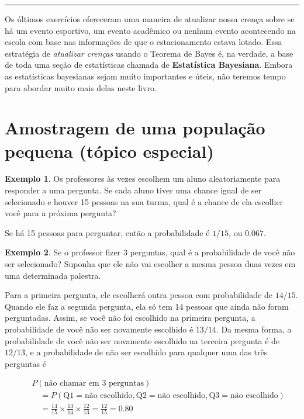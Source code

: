 \documentclass[
]{book}
\theoremstyle{definition}
\theoremstyle{definition}
\newtheorem{example}{Exemplo}[chapter]
\theoremstyle{definition}
\theoremstyle{definition}
\theoremstyle{remark}
\begin{document}
\begin{center}\rule{0.5\linewidth}{0.5pt}\end{center}

Os últimos exercícios ofereceram uma maneira de atualizar nossa crença sobre se há um evento esportivo, um evento acadêmico ou nenhum evento acontecendo na escola com base nas informações de que o estacionamento estava lotado. Essa estratégia de \emph{atualizar crenças} usando o Teorema de Bayes é, na verdade, a base de toda uma seção de estatísticas chamada de \textbf{Estatística Bayesiana}. Embora as estatísticas bayesianas sejam muito importantes e úteis, não teremos tempo para abordar muito mais delas neste livro.

\hypertarget{smallPop}{%
\section{Amostragem de uma população pequena (tópico especial)}\label{smallPop}}

\begin{example}
\protect\hypertarget{exm:unnamed-chunk-68}{}{\label{exm:unnamed-chunk-68} }Os professores às vezes escolhem um aluno aleatoriamente para responder a uma pergunta. Se cada aluno tiver uma chance igual de ser selecionado e houver 15 pessoas na sua turma, qual é a chance de ela escolher você para a próxima pergunta?
\end{example}

Se há 15 pessoas para perguntar, então a probabilidade é \(1/15\), ou \(0.067\).

\begin{example}
\protect\hypertarget{exm:3woRep}{}{\label{exm:3woRep} }Se o professor fizer 3 perguntas, qual é a probabilidade de você não ser selecionado? Suponha que ele não vai escolher a mesma pessoa duas vezes em uma determinada palestra.
\end{example}

Para a primeira pergunta, ele escolherá outra pessoa com probabilidade de \(14/15\). Quando ele faz a segunda pergunta, ela só tem 14 pessoas que ainda não foram perguntadas. Assim, se você não foi escolhido na primeira pergunta, a probabilidade de você não ser novamente escolhido é \(13/14\). Da mesma forma, a probabilidade de você não ser novamente escolhido na terceira pergunta é de \(12/13\), e a probabilidade de não ser escolhido para qualquer uma das três perguntas é

\begin{eqnarray*}
&&P(\text{não chamar em 3 perguntas})
\\
&&\quad= P(\text{Q1} = \text{não escolhido}, \text{Q2} = \text{não escolhido}, \text{Q3} = \text{não escolhido}) \\
&&\quad = \frac{14}{15}\times\frac{13}{14}\times\frac{12}{13} = \frac{12}{15} = 0.80
\end{eqnarray*}
\end{document}
